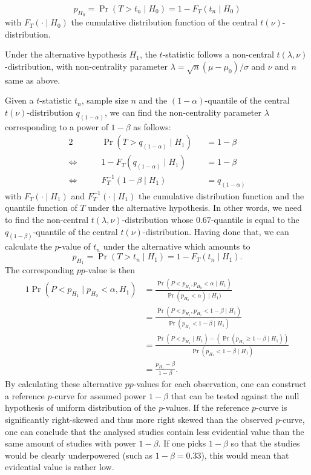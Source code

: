 $$p_{H_0} = \Pr(T>t_n \mid H_0) = 1-F_T(t_n\mid H_0)$$
with $F_{T}(\cdot \mid H_0)$ the cumulative distribution function of the central $t(\nu)$-distribution.\par
Under the alternative hypothesis $H_1$, the $t$-statistic follows a non-central $t(\lambda,\nu)$-distribution, with non-centrality parameter ${\lambda = \sqrt{n}(\mu-\mu_0)/\sigma}$ and $\nu$ and $n$ same as above.\par
Given a $t$-statistic $t_n$, sample size $n$ and the $(1-\alpha)$-quantile of the central $t(\nu)$-distribution $q_{(1-\alpha)}$, we can find the non-centrality parameter $\lambda$ corresponding to a power of $1-\beta$ as follows:
\begin{alignat*}{2}
    \phantom{\Longleftrightarrow}\quad &\Pr(T > q_{(1-\alpha)} \mid H_1) &&= 1-\beta\\
    \Longleftrightarrow\quad &1-F_{T}(q_{(1-\alpha)} \mid H_1) &&= 1-\beta\\
    \Longleftrightarrow\quad &F^{-1}_{T}(1-\beta\mid H_1) &&= q_{(1-\alpha)}
\end{alignat*}
with $F_{T}(\cdot \mid H_1)$ and $F_{T}^{-1}(\cdot \mid H_1)$ the cumulative distribution function and the quantile function of $T$ under the alternative hypothesis. In other words, we need to find the non-central $t(\lambda,\nu)$-distribution whose $0.67$-quantile is equal to the $q_{(1-\beta)}$-quantile of the central $t(\nu)$-distribution. Having done that, we can calculate the $p$-value of $t_n$ under the alternative which amounts to 
$$p_{H_1} = \Pr(T>t_n \mid H_1) = 1-F_T(t_n\mid H_1).$$ 
The corresponding $pp$-value is then
\begin{alignat*}{1}
    \Pr(P<p_{H_1} \mid p_{H_0} < \alpha, H_1) &= \frac{\Pr(P<p_{H_1}, p_{H_0} < \alpha\mid H_1)}{\Pr(p_{H_0}<\alpha)\mid H_1)}\\ 
    &= \frac{\Pr(P<p_{H_1}, p_{H_1} < 1-\beta\mid H_1)}{\Pr(p_{H_1}<1-\beta \mid H_1)}\\ 
    &= \frac{\Pr(P<p_{H_1}\mid H_1) - (\Pr(p_{H_1} \geq 1-\beta \mid H_1))}{\Pr(p_{H_1}<1-\beta \mid H_1)}\\
    &= \frac{p_{H_1}-\beta}{1-\beta}.
\end{alignat*}
By calculating these alternative $pp$-values for each observation, one can construct a reference $p$-curve for assumed power $1-\beta$ that can be tested against the null hypothesis of uniform distribution of the $p$-values. If the reference $p$-curve is significantly right-skewed and thus more right skewed than the observed $p$-curve, one can conclude that the analysed studies contain less evidential value than the same amount of studies with power $1-\beta$. If one picks $1-\beta$ so that the studies would be clearly underpowered (such as $1-\beta = 0.33$), this would mean that evidential value is rather low.\par
